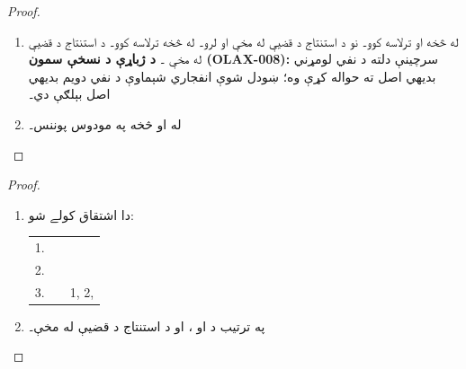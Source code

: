 \documentclass[12pt,a4paper,oneside]{report}
\makeatletter
\renewcommand{\MP}{\LR{\latinfont MP}}
\renewcommand{\Hyp}{\LR{\latinfont Hyp}}
\gdef\pspart{#2}\gdef\pschapter{#3}\gdef\pssection{}%
\newcommand{\ollabel}[1]{\label{\pspart:\pschapter:\pssection:#1}}
\newtheorem{prop}[thm]{قضيه}
\theoremstyle{definition}
\newenvironment{derivation}{%
  \par\smallskip\begin{LTR}\begin{tabular}{@{}rll@{}}}
  {\end{tabular}\end{LTR}\par\smallskip}
\makeatother
\begin{document}
\label{olpseg:OLP-0122-B009:start}
\label{olpseg:OLP-0122-B009:end}

\label{olpseg:OLP-0122-B010:start}
\begin{proof}
  \begin{enumerate}
  \item له  څخه
     او
     ترلاسه کوو۔ نو د
    استنتاج د قضیې له مخې 
    او  لرو۔ له
     څخه
    ترلاسه کوو۔ د استنتاج د قضیې له مخې
    ۔
    \textbf{د ژباړې د نسخې سمون (OLAX-008):} سرچينې دلته د نفي
    لومړني بديهي اصل ته حواله کړې وه؛ ښودل شوې انفجاري شېماوې د نفي
    دويم بديهي اصل بېلګې دي۔
  \item له  او  څخه په
    مودوس پوننس۔
  \end{enumerate}
\end{proof}
\label{olpseg:OLP-0122-B010:end}

\label{olpseg:OLP-0122-B011:start}
\label{olpseg:OLP-0122-B011:end}

\label{olpseg:OLP-0122-B012:start}
\begin{proof}
  \begin{enumerate}
  \item دا اشتقاق کولے شو:
    \begin{derivation}
      1. & \LR{$!A$} & \Hyp\\
      2. & \LR{$!A \lif !B$} & \Hyp\\
      3. & \LR{$!B$} & 1, 2, \MP
    \end{derivation}
\label{olpseg:OLP-0122-B012:end}

\label{olpseg:OLP-0122-B013:start}
\item په ترتيب د  او
    ، او د استنتاج د قضیې له مخې۔
  \end{enumerate}
\end{proof}
\label{olpseg:OLP-0122-B013:end}
\end{document}
